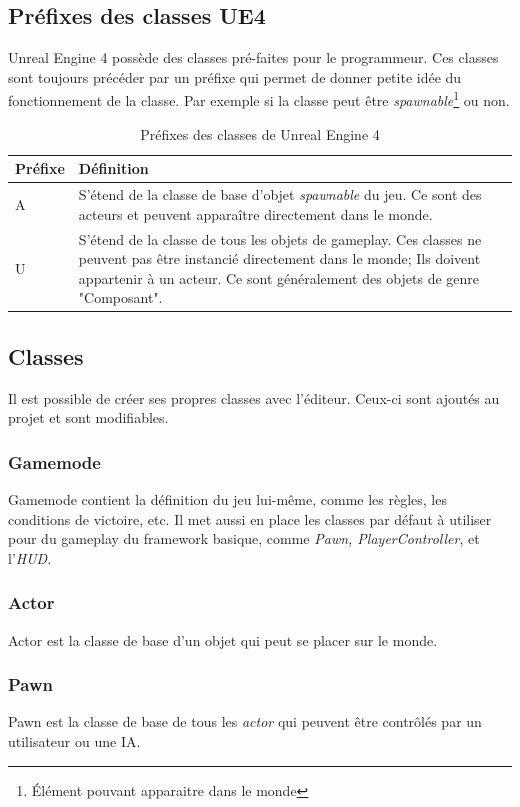 \documentclass[11pt, a4paper, oneside]{article}
\begin{document}
\subsection{Préfixes des classes UE4}
Unreal Engine 4 possède des classes pré-faites pour le programmeur. Ces classes sont toujours précéder par un préfixe qui permet de donner petite idée du fonctionnement de la classe. Par exemple si la classe peut être \emph{spawnable}\footnote{Élément pouvant apparaitre dans le monde} ou non.
\begin{table}[h]
	\begin{center}
		\begin{tabularx}{\textwidth}{ l X }
			\hline
			\textbf{Préfixe} & \textbf{Définition}\\
			\hline
			\hline
			A & S'étend de la classe de base d'objet \emph{spawnable} du jeu. Ce sont des acteurs et peuvent apparaître directement dans le monde.\\
			\hline
			U & S'étend de la classe de tous les objets de gameplay. Ces classes ne peuvent pas être instancié directement dans le monde; Ils doivent appartenir à un acteur. Ce sont généralement des objets de genre "Composant".\\
			\hline
		\end{tabularx}
		\caption{Préfixes des classes de Unreal Engine 4}
		\label{table:prefixesclasses}
	\end{center}
\end{table}

\subsection{Classes}
Il est possible de créer ses propres classes avec l'éditeur. Ceux-ci sont ajoutés au projet et sont modifiables.
\subsubsection{Gamemode}
Gamemode contient la définition du jeu lui-même, comme les règles, les conditions de victoire, etc. Il met aussi en place les classes par défaut à utiliser pour du gameplay du framework basique, comme \textit{Pawn, PlayerController}, et l'\textit{HUD}.
\subsubsection{Actor}
Actor est la classe de base d'un objet qui peut se placer sur le monde.
\subsubsection{Pawn}
Pawn est la classe de base de tous les \emph{actor} qui peuvent être contrôlés par un utilisateur ou une IA.
\end{document}

